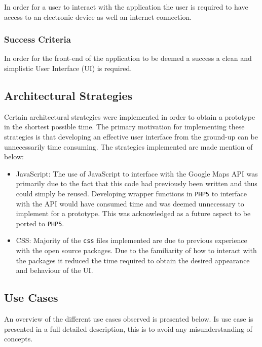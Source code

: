 \documentclass[10pt,twocolumn]{witseiepaper}
\begin{document}
			In order for a user to interact with the application the user is required to have access to an electronic device as well an internet connection. 
			
		\subsubsection{Success Criteria}
		
			In order for the front-end of the application to be deemed a success a clean and simplistic User Interface (UI) is required. 
			
	\subsection{Architectural Strategies}
	
		Certain architectural strategies were implemented in order to obtain a prototype in the shortest possible time. The primary motivation for implementing these strategies is that developing an effective user interface from the ground-up can be unnecessarily time consuming. The strategies implemented are made mention of below:
		
		\begin{itemize}
			\item JavaScript: The use of JavaScript to interface with the Google Maps API was primarily due to the fact that this code had previously been written and thus could simply be reused. Developing wrapper functions in \texttt{PHP5} to interface with the API would have consumed time and was deemed unnecessary to implement for a prototype. This was acknowledged as a future aspect to be ported to \texttt{PHP5}.
			\item CSS: Majority of the \texttt{css} files implemented are due to previous experience with the open source packages. Due to the familiarity of how to interact with the packages it reduced the time required to obtain the desired appearance and behaviour of the UI.
		\end{itemize}
		
	\subsection{Use Cases}
	
		An overview of the different use cases observed is presented below. Is use case is presented in a full detailed description, this is to avoid any misunderstanding of concepts.
	
\end{document}

